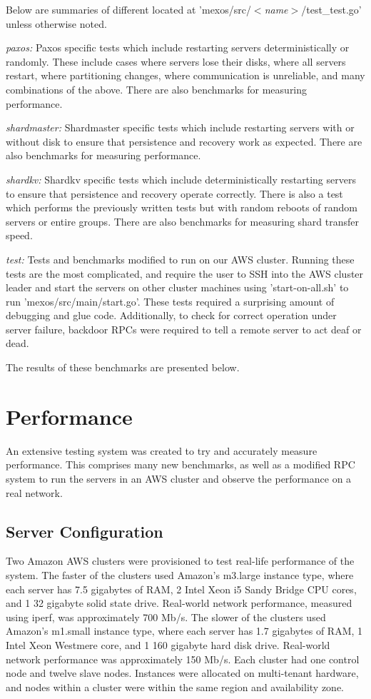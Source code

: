 \documentclass[letterpaper,10pt]{article}
\begin{document}
Below are summaries of different located at 'mexos/src/\emph{$<$name$>$}/test\_test.go' unless otherwise noted.

\emph{paxos:} Paxos specific tests which include restarting servers deterministically or randomly.  These include cases where servers lose their disks, where all servers restart, where partitioning changes, where communication is unreliable, and many combinations of the above.  There are also benchmarks for measuring performance.

\emph{shardmaster:} Shardmaster specific tests which include restarting servers with or without disk to ensure that persistence and recovery work as expected.  There are also benchmarks for measuring performance.

\emph{shardkv:} Shardkv specific tests which include deterministically restarting servers to ensure that persistence and recovery operate correctly.  There is also a test which performs the previously written tests but with random reboots of random servers or entire groups.  There are also benchmarks for measuring shard transfer speed.

\emph{test:} Tests and benchmarks modified to run on our AWS cluster.  Running these tests are the most complicated, and require the user to SSH into the AWS cluster leader and start the servers on other cluster machines using 'start-on-all.sh' to run 'mexos/src/main/start.go'. These tests required a surprising amount of debugging and glue code.  Additionally, to check for correct operation under server failure, backdoor RPCs were required to tell a remote server to act deaf or dead.

The results of these benchmarks are presented below.

\section{Performance}

An extensive testing system was created to try and accurately measure performance.  This comprises many new benchmarks, as well as a modified RPC system to run the servers in an AWS cluster and observe the performance on a real network.

\subsection{Server Configuration}

Two Amazon AWS clusters were provisioned to test real-life performance of the system. The faster of the clusters used Amazon's m3.large instance type, where each server has 7.5 gigabytes of RAM, 2 Intel Xeon i5 Sandy Bridge CPU cores, and 1 32 gigabyte solid state drive. Real-world network performance, measured using iperf, was approximately 700 Mb/s. The slower of the clusters used Amazon's m1.small instance type, where each server has 1.7 gigabytes of RAM, 1 Intel Xeon Westmere core, and 1 160 gigabyte hard disk drive. Real-world network performance was approximately 150 Mb/s. Each cluster had one control node and twelve slave nodes. Instances were allocated on multi-tenant hardware, and nodes within a cluster were within the same region and availability zone.
\end{document}
